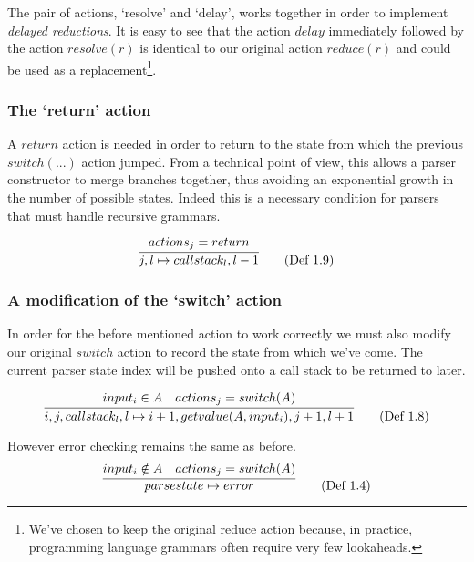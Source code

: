 \documentclass[11pt]{article}
\begin{document}
The pair of actions, `resolve' and `delay', works together in order to implement \emph{delayed reductions}. 
It is easy to see that the action $delay$ immediately followed by the action $resolve(r)$ is identical to our original action $reduce(r)$ and could be used as a replacement\footnote{We've chosen to keep the original reduce action because, in practice, programming language grammars often require very few lookaheads.}.

\subsubsection{The `return' action}
A $return$ action is needed in order to return to the state from which the previous $switch(...)$ action jumped. 
From a technical point of view, this allows a parser constructor to merge branches together, thus avoiding an exponential growth in the number of possible states. 
Indeed this is a necessary condition for parsers that must handle recursive grammars.

\begin{equation}
\infer{j, l \mapsto callstack_l, l-1}{actions_j = return} \tag{Def 1.9}
\end{equation}

\subsubsection{A modification of the `switch' action}
In order for the before mentioned action to work correctly we must also modify our original $switch$ action to record the state from which we've come.
The current parser state index will be pushed onto a call stack to be returned to later.

\begin{equation}
\infer{i, j, callstack_l, l \mapsto i+1, getvalue(A, input_i), j+1, l+1}{input_i \in A & actions_j = switch(A)} \tag{Def 1.8}
\end{equation}

However error checking remains the same as before.
\begin{equation}
\infer{parsestate \mapsto error}{input_i \notin A & actions_j = switch(A)} \tag{Def 1.4}
\end{equation}
\end{document}
